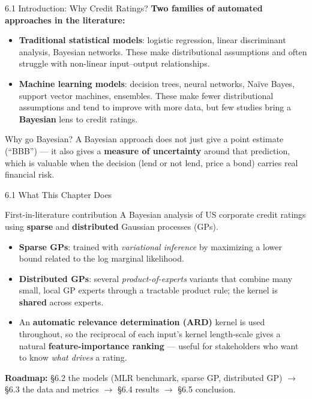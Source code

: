 \documentclass[aspectratio=169,10pt]{beamer}
\begin{document}
\begin{frame}[allowframebreaks]{6.1 Introduction: Why Credit Ratings?}
  \textbf{Two families of automated approaches in the literature:}
  \begin{itemize}
    \item \textbf{Traditional statistical models}: logistic regression, linear
          discriminant analysis, Bayesian networks. These make distributional
          assumptions and often struggle with non-linear input--output
          relationships.
    \item \textbf{Machine learning models}: decision trees, neural networks,
          Na\"ive Bayes, support vector machines, ensembles. These make fewer
          distributional assumptions and tend to improve with more data, but
          few studies bring a \textbf{Bayesian} lens to credit ratings.
  \end{itemize}
  \vspace{0.3em}
  \begin{alertblock}{Why go Bayesian?}
    A Bayesian approach does not just give a point estimate (``BBB'') --- it
    also gives a \textbf{measure of uncertainty} around that prediction, which
    is valuable when the decision (lend or not lend, price a bond) carries
    real financial risk.
  \end{alertblock}
\end{frame}

\begin{frame}{6.1 What This Chapter Does}
  \begin{block}{First-in-literature contribution}
    A Bayesian analysis of US corporate credit ratings using
    \textbf{sparse} and \textbf{distributed} Gaussian processes (GPs).
  \end{block}
  \begin{itemize}
    \item \textbf{Sparse GPs}: trained with \emph{variational inference} by
          maximizing a lower bound related to the log marginal likelihood.
    \item \textbf{Distributed GPs}: several \emph{product-of-experts} variants
          that combine many small, local GP experts through a tractable
          product rule; the kernel is \textbf{shared} across experts.
    \item An \textbf{automatic relevance determination (ARD)} kernel is used
          throughout, so the reciprocal of each input's kernel length-scale
          gives a natural \textbf{feature-importance ranking} --- useful for
          stakeholders who want to know \emph{what drives} a rating.
  \end{itemize}
  \vspace{0.3em}
  \textbf{Roadmap:} \S6.2 the models (MLR benchmark, sparse GP, distributed
  GP) $\rightarrow$ \S6.3 the data and metrics $\rightarrow$ \S6.4 results
  $\rightarrow$ \S6.5 conclusion.
\end{frame}
\end{document}
